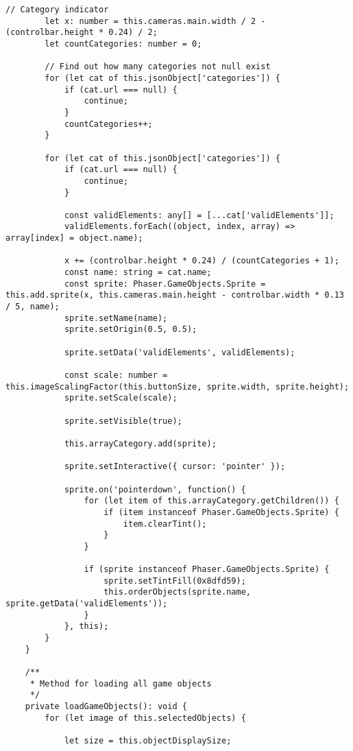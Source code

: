 \begin{lstlisting}[style=TypeScript, caption={sortingScene.ts}]
        // Category indicator
        let x: number = this.cameras.main.width / 2 - (controlbar.height * 0.24) / 2;
        let countCategories: number = 0;

        // Find out how many categories not null exist
        for (let cat of this.jsonObject['categories']) {
            if (cat.url === null) {
                continue;
            }
            countCategories++;
        }

        for (let cat of this.jsonObject['categories']) {
            if (cat.url === null) {
                continue;
            }

            const validElements: any[] = [...cat['validElements']];
            validElements.forEach((object, index, array) => array[index] = object.name);

            x += (controlbar.height * 0.24) / (countCategories + 1);
            const name: string = cat.name;
            const sprite: Phaser.GameObjects.Sprite = this.add.sprite(x, this.cameras.main.height - controlbar.width * 0.13 / 5, name);
            sprite.setName(name);
            sprite.setOrigin(0.5, 0.5);

            sprite.setData('validElements', validElements);

            const scale: number = this.imageScalingFactor(this.buttonSize, sprite.width, sprite.height);
            sprite.setScale(scale);

            sprite.setVisible(true);

            this.arrayCategory.add(sprite);

            sprite.setInteractive({ cursor: 'pointer' });

            sprite.on('pointerdown', function() {
                for (let item of this.arrayCategory.getChildren()) {
                    if (item instanceof Phaser.GameObjects.Sprite) {
                        item.clearTint();
                    }
                }

                if (sprite instanceof Phaser.GameObjects.Sprite) {
                    sprite.setTintFill(0x8dfd59);
                    this.orderObjects(sprite.name, sprite.getData('validElements'));
                }
            }, this);
        }
    }

    /**
     * Method for loading all game objects
     */
    private loadGameObjects(): void {
        for (let image of this.selectedObjects) {

            let size = this.objectDisplaySize;


\end{lstlisting}
